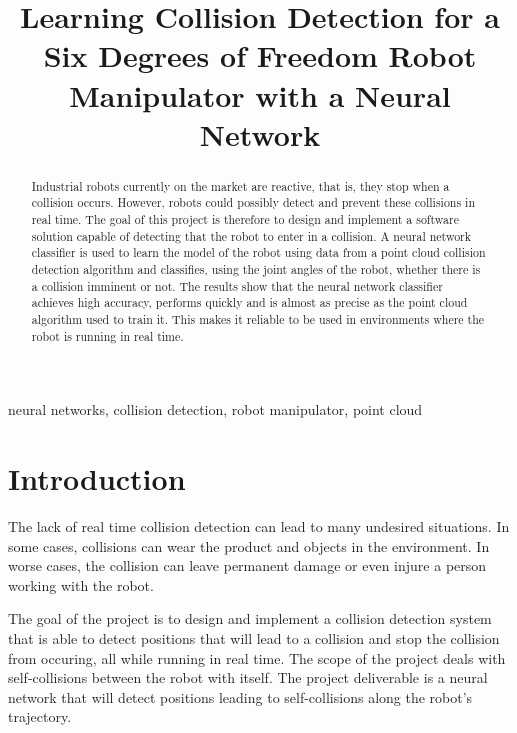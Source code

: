 \documentclass[conference]{IEEEtran}
\begin{document}
\title{Learning Collision Detection for a Six Degrees of Freedom Robot Manipulator with a Neural Network}

\author{
}

\maketitle

\begin{abstract}
Industrial robots currently on the market are reactive, that is, they stop when a collision occurs. However, robots could possibly detect and prevent these collisions in real time. The goal of this project is therefore to design and implement a software solution capable of detecting that the robot to enter in a collision. A neural network classifier is used to learn the model of the robot using data from a point cloud collision detection algorithm and classifies, using the joint angles of the robot, whether there is a collision imminent or not. The results show that the neural network classifier achieves high accuracy, performs quickly and is almost as precise as the point cloud algorithm used to train it. This makes it reliable to be used in environments where the robot is running in real time.
\end{abstract}

\begin{IEEEkeywords}
neural networks, collision detection, robot manipulator, point cloud
\end{IEEEkeywords}

\section{Introduction}

The lack of real time collision detection can lead to many undesired situations. In some cases, collisions can wear the product and objects in the environment. In worse cases, the collision can leave permanent damage or even injure a person working with the robot.

The goal of the project is to design and implement a collision detection system that is able to detect positions that will lead to a collision and stop the collision from occuring, all while running in real time. The scope of the project deals with self-collisions between the robot with itself. The project deliverable is a neural network that will detect positions leading to self-collisions along the robot's trajectory.
\end{document}
